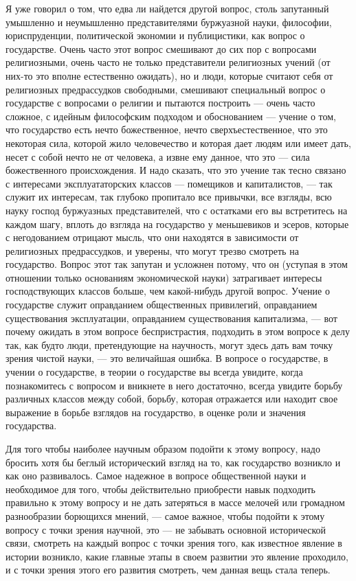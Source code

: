 \documentclass[12pt]{article}
\newcommand{\parnum}{(\arabic{parcount})}
\newcounter{parcount}
\newenvironment{parnumbers}{%
  \par%
  \everypar{\noindent \stepcounter{parcount}\marginpar[]{\parnum}}%
}{}
\begin{document}
\begin{parnumbers}
Я уже говорил о том, что едва ли найдется другой вопрос, столь запутанный умышленно и неумышленно представителями буржуазной науки, философии, юриспруденции, политической экономии и публицистики, как вопрос о государстве. Очень часто этот вопрос смешивают до сих пор с вопросами религиозными, очень часто не только представители религиозных учений (от них-то это вполне естественно ожидать), но и люди, которые считают себя от религиозных предрассудков свободными, смешивают специальный вопрос о государстве с вопросами о религии и пытаются построить — очень часто сложное, с идейным философским подходом и обоснованием — учение о том, что государство есть нечто божественное, нечто сверхъестественное, что это некоторая сила, которой жило человечество и которая дает людям или имеет дать, несет с собой нечто не от человека, а извне ему данное, что это — сила божественного происхождения. И надо сказать, что это учение так тесно связано с интересами эксплуататорских классов — помещиков и капиталистов, — так служит их интересам, так глубоко пропитало все привычки, все взгляды, всю науку господ буржуазных представителей, что с остатками его вы встретитесь на каждом шагу, вплоть до взгляда на государство у меньшевиков и эсеров, которые с негодованием отрицают мысль, что они находятся в зависимости от религиозных предрассудков, и уверены, что могут трезво смотреть на государство. Вопрос этот так запутан и усложнен потому, что он (уступая в этом отношении только основаниям экономической науки) затрагивает интересы господствующих классов больше, чем какой-нибудь другой вопрос. Учение о государстве служит оправданием общественных привилегий, оправданием существования эксплуатации, оправданием существования капитализма, — вот почему ожидать в этом вопросе беспристрастия, подходить в этом вопросе к делу так, как будто люди, претендующие на научность, могут здесь дать вам точку зрения чистой науки, — это величайшая ошибка. В вопросе о государстве, в учении о государстве, в теории о государстве вы всегда увидите, когда познакомитесь с вопросом и вникнете в него достаточно, всегда увидите борьбу различных классов между собой, борьбу, которая отражается или находит свое выражение в борьбе взглядов на государство, в оценке роли и значения государства.

Для того чтобы наиболее научным образом подойти к этому вопросу, надо бросить хотя бы беглый исторический взгляд на то, как государство возникло и как оно развивалось. Самое надежное в вопросе общественной науки и необходимое для того, чтобы действительно приобрести навык подходить правильно к этому вопросу и не дать затеряться в массе мелочей или громадном разнообразии борющихся мнений, — самое важное, чтобы подойти к этому вопросу с точки зрения научной, это — не забывать основной исторической связи, смотреть на каждый вопрос с точки зрения того, как известное явление в истории возникло, какие главные этапы в своем развитии это явление проходило, и с точки зрения этого его развития смотреть, чем данная вещь стала теперь.


\end{parnumbers}
\end{document}

